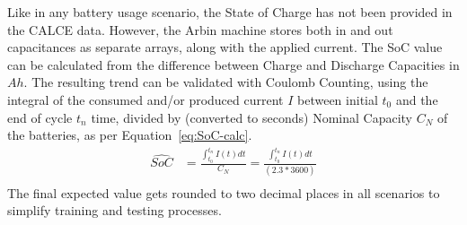 %
Like in any battery usage scenario, the State of Charge has not been provided in the CALCE data.
However, the Arbin machine stores both in and out capacitances as separate arrays, along with the applied current.
The SoC value can be calculated from the difference between Charge and Discharge Capacities in $Ah$.
The resulting trend can be validated with Coulomb Counting, using the integral of the consumed and/or produced current $I$ between initial $t_0$ and the end of cycle $t_n$ time, divided by (converted to seconds) Nominal Capacity $C_{N}$ of the batteries, as per \mbox{Equation~\ref{eq:SoC-calc}}.
\begin{equation}
    \begin{split}
        \hat{SoC} &= \frac{\int_{t_0}^{t_n} I(t)dt} {C_{N}} = \frac{\int_{t_0}^{t_n} I(t)dt} {(2.3*3600)} \\
        \label{eq:SoC-calc}
    \end{split}
\end{equation}
The final expected value gets rounded to two decimal places in all scenarios to simplify training and testing processes.

